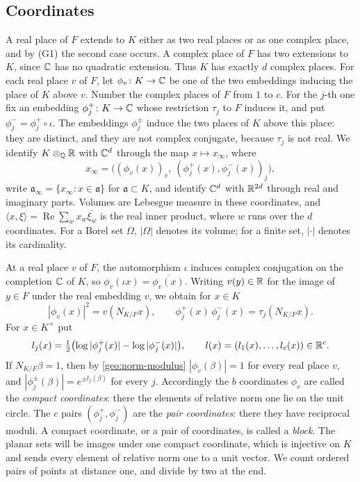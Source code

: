 \subsection{Coordinates}
A real place of $F$ extends to $K$ either as two real places or as one
complex place, and by (G1) the second case occurs. A complex place of
$F$ has two extensions to $K$, since $\mathbb C$ has no quadratic extension.
Thus $K$ has exactly $d$ complex places. For each real place $v$ of
$F$, let $\phi_v\colon K\to\mathbb C$ be one of the two embeddings inducing
the place of $K$ above $v$. Number the complex places of $F$ from $1$
to $c$. For the $j$-th one fix an embedding $\phi_j^+\colon K\to\mathbb C$
whose restriction $\tau_j$ to $F$ induces it, and put
$\phi_j^-=\phi_j^+\circ\iota$. The embeddings $\phi_j^\pm$ induce
the two places of $K$ above this place: they are distinct, and they are
not complex conjugate, because $\tau_j$ is not real. We identify
$K\otimes_\mathbb Q\mathbb R$ with $\mathbb C^d$ through the map $x\mapsto x_\infty$, where
\[
 x_\infty=\bigl((\phi_v(x))_v,\ (\phi_j^+(x),\phi_j^-(x))_{j}\bigr),
\]
write $\mathfrak a_\infty=\{x_\infty:x\in\mathfrak a\}$ for
$\mathfrak a\subset K$, and identify $\mathbb C^d$ with $\mathbb R^{2d}$ through real
and imaginary parts. Volumes are Lebesgue measure in these coordinates,
and $\langle x,\xi\rangle=\operatorname{Re}\sum_w x_w\overline{\xi_w}$
is the real inner product, where $w$ runs over the $d$ coordinates. For a
Borel set $\Omega$, $|\Omega|$ denotes its volume; for a finite set, $|\cdot|$
denotes its cardinality.

At a real place $v$ of $F$, the automorphism $\iota$ induces complex
conjugation on the completion $\mathbb C$ of $K$, so
$\phi_v(\iota x)=\overline{\phi_v(x)}$. Writing $v(y)\in\mathbb R$ for the
image of $y\in F$ under the real embedding $v$, we obtain for $x\in K$
\begin{equation}\label{geo:norm-modulus}
 |\phi_v(x)|^2=v(N_{K/F}x),\qquad
 \phi_j^+(x)\,\phi_j^-(x)=\tau_j(N_{K/F}x).
\end{equation}
For $x\in K^\times$ put
\[
 l_j(x)=\tfrac12\bigl(\log|\phi_j^+(x)|-\log|\phi_j^-(x)|\bigr),
 \qquad l(x)=(l_1(x),\dots,l_c(x))\in\mathbb R^c .
\]
If $N_{K/F}\beta=1$, then by \eqref{geo:norm-modulus}
$|\phi_v(\beta)|=1$ for every real place $v$, and
$|\phi_j^\pm(\beta)|=e^{\pm l_j(\beta)}$ for every $j$. Accordingly the
$b$ coordinates $\phi_v$ are called the \emph{compact coordinates}:
there the elements of relative norm one lie on the unit circle. The $c$
pairs $(\phi_j^+,\phi_j^-)$ are the \emph{pair coordinates}: there
they have reciprocal moduli. A compact coordinate, or a pair of
coordinates, is called a \emph{block}. The planar sets will be images
under one compact coordinate, which is injective on $K$ and sends every
element of relative norm one to a unit vector. We count ordered pairs of
points at distance one, and divide by two at the end.

